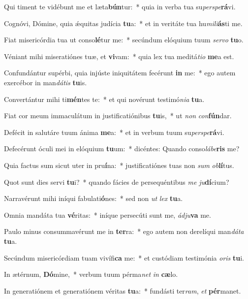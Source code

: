 \item Qui timent te vidébunt me et læta\textbf{bún}tur:~* quia in verba tua su\textit{per}\textit{spe}\textbf{rá}vi.
\item Cognóvi, Dómine, quia ǽquitas judícia \textbf{tu}a:~* et in veritáte tua hu\textit{mi}\textit{li}\textbf{ás}ti me.
\item Fiat misericórdia tua ut conso\textbf{lé}tur me:~* secúndum elóquium tuum \textit{ser}\textit{vo} \textbf{tu}o.
\item Véniant mihi miseratiónes tuæ, et \textbf{vi}vam:~* quia lex tua meditá\textit{ti}\textit{o} \textbf{me}a est.
\item Confundántur supérbi, quia injúste iniquitátem fecérunt \textbf{in} me:~* ego autem exercébor in man\textit{dá}\textit{tis} \textbf{tu}is.
\item Convertántur mihi ti\textbf{mén}tes te:~* et qui novérunt testimó\textit{ni}\textit{a} \textbf{tu}a.
\item Fiat cor meum immaculátum in justificatiónibus \textbf{tu}is,~* ut \textit{non} \textit{con}\textbf{fún}dar.
\item Defécit in salutáre tuum ánima \textbf{me}a:~* et in verbum tuum su\textit{per}\textit{spe}\textbf{rá}vi.
\item Defecérunt óculi mei in elóquium \textbf{tu}um:~* dicéntes: Quando conso\textit{lá}\textit{be}\textbf{ris} me?
\item Quia factus sum sicut uter in pru\textbf{í}na:~* justificatiónes tuas non \textit{sum} \textit{ob}\textbf{lí}tus.
\item Quot sunt dies servi \textbf{tu}i?~* quando fácies de persequéntibus \textit{me} \textit{ju}\textbf{dí}cium?
\item Narravérunt mihi iníqui fabulati\textbf{ó}nes:~* sed non \textit{ut} \textit{lex} \textbf{tu}a.
\item Omnia mandáta tua \textbf{vé}ritas:~* iníque persecúti sunt me, \textit{ád}\textit{ju}\textbf{va} me.
\item Paulo minus consummavérunt me in \textbf{ter}ra:~* ego autem non derelíqui man\textit{dá}\textit{ta} \textbf{tu}a.
\item Secúndum misericórdiam tuam vivífi\textbf{ca} me:~* et custódiam testimónia \textit{o}\textit{ris} \textbf{tu}i.
\item In ætérnum, \textbf{Dó}mine,~* verbum tuum pérma\textit{net} \textit{in} \textbf{cæ}lo.
\item In generatiónem et generatiónem véritas \textbf{tu}a:~* fundásti ter\textit{ram}, \textit{et} \textbf{pér}manet.
